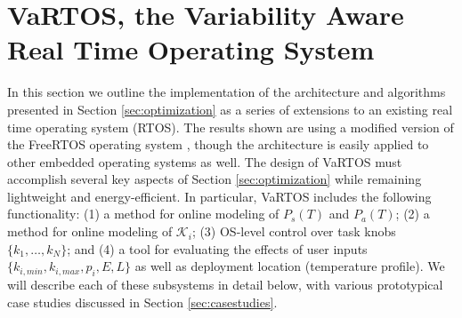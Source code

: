 \section{VaRTOS, the Variability Aware Real Time Operating System}
\label{sec:vartos}

In this section we outline the implementation of the architecture and algorithms presented in Section \ref{sec:optimization} as a series of extensions to an existing real time operating system (RTOS).  The results shown are using a modified version of the FreeRTOS operating system \cite{freertos}, though the architecture is easily applied to other embedded operating systems as well. The design of VaRTOS must accomplish several key aspects of Section \ref{sec:optimization} while remaining lightweight and energy-efficient.  In particular, VaRTOS includes the following functionality: (1) a method for online modeling of $P_s(T)$ and $P_a(T)$; (2) a method for online modeling of $\mathcal{K}_i$; (3) OS-level control over task knobs $\{k_1,\ldots,k_N\}$; and (4) a tool for evaluating the effects of user inputs $\{k_{i,min},k_{i,max},p_i,E,L\}$ as well as deployment location (temperature profile).  We will describe each of these subsystems in detail below, with various prototypical case studies discussed in Section \ref{sec:casestudies}. 

